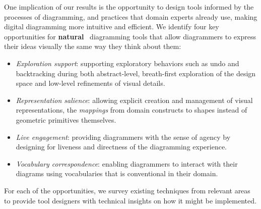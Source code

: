 One implication of our results is the opportunity to design tools informed by the processes of diagramming, and practices that domain experts already use, making digital diagramming more intuitive and efficient. We identify four key opportunities for \textbf{natural}~\cite{myers2004natural} diagramming tools that allow diagrammers to express their ideas visually the same way they think about them:
%
\begin{itemize} [noitemsep,topsep=-4pt,parsep=2pt,partopsep=0pt]
    \item \textit{Exploration support}: supporting exploratory behaviors such as undo and backtracking during both abstract-level, breath-first exploration of the design space and low-level refinements of visual details.
    \item \textit{Representation salience}: allowing explicit creation and management of visual representations, \ie{} the \emph{mappings} from domain constructs to shapes instead of geometric primitives themselves.
    \item \textit{Live engagement}: providing diagrammers with the sense of agency by designing for liveness and directness of the diagramming experience. 
    \item \textit{Vocabulary correspondence}: enabling diagrammers to interact with their diagrams using vocabularies that is conventional in their domain.
\end{itemize}
%
For each of the opportunities, we survey existing techniques from relevant areas to provide tool designers with technical insights on how it might be implemented.



